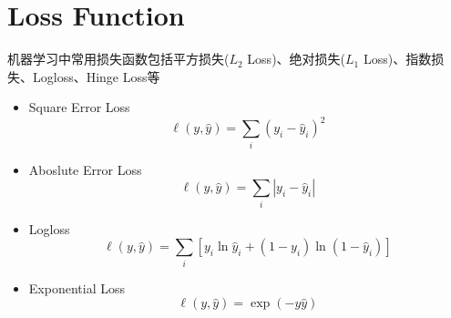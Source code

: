 \documentclass[a4paper]{article}
\begin{document}
\section{Loss Function}
	机器学习中常用损失函数包括平方损失($L_2$ Loss)、绝对损失($L_1$ Loss)、指数损失、Logloss、Hinge Loss等
	\begin{itemize}
		\item Square Error Loss
		$$\ell(y, \hat{y}) = \sum_i\left(y_i-\hat{y}_i\right)^2$$
		\item Aboslute Error Loss
		$$\ell(y, \hat{y}) = \sum_i\left|y_i-\hat{y}_i\right|$$
		\item Logloss
		$$\ell(y, \hat{y}) = \sum_i\left[y_i\ln \hat{y}_i+(1-y_i)\ln (1-\hat{y}_i)\right]$$
		\item Exponential Loss
		$$\ell(y, \hat{y}) = \exp(-y\hat{y})$$
	\end{itemize}
\end{document}
